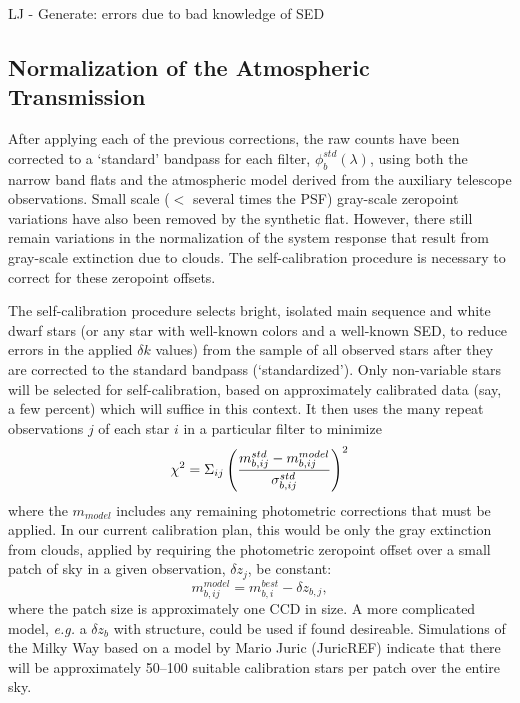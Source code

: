 \documentclass[12pt,preprint]{aastex}
\begin{document}
LJ - Generate: errors due to bad knowledge of SED


\subsection{Normalization of the Atmospheric Transmission}
\label{sec:selfcalib}

After applying each of the previous corrections, the raw counts have been
corrected to a `standard' bandpass for each filter,
$\phi_b^{std}(\lambda)$, using both the narrow band flats and the
atmospheric model derived from the auxiliary telescope
observations. Small scale ($<$ several times the PSF) gray-scale
zeropoint variations have also been removed by the synthetic
flat. However, there still remain variations in the normalization of the
system response that result from gray-scale extinction due to
clouds. The self-calibration procedure is necessary to correct for
these zeropoint offsets.

The self-calibration procedure selects bright, isolated main sequence
and white dwarf stars (or any star with well-known colors and a
well-known SED, to reduce errors in the applied
$\delta k$ values) from the sample of all observed stars after they are
corrected to the standard bandpass (`standardized'). Only non-variable stars will be
selected for self-calibration, based on approximately calibrated data
(say, a few percent) which will suffice in this context. It then uses
the many repeat observations $j$ of each star $i$ in a particular filter to minimize
\begin{equation}
\label{eqn:selfcalmin}
\chi^2 = \Sigma_{ij} \left(  { m_{b,ij}^{std} - m_{b,ij}^{model} \over
    \sigma_{b,ij}^{std} } \right)^2
\end{equation}
where the $m_{model}$ includes any remaining photometric corrections
that must be applied. In our current calibration plan, this would be only the
gray extinction from clouds, applied by requiring the photometric
zeropoint offset over a small patch of sky in a given observation, $\delta z_j$, be constant:
\begin{equation}
\label{eqn:zp}
m^{model}_{b,ij} = m^{best}_{b,i} - \delta z_{b,j},
\end{equation}
where the patch size is approximately one CCD in size. A more
complicated model, {\it e.g.} a $\delta z_{b}$ with structure, could
be used if found desireable. Simulations of the Milky Way based on a
model by Mario Juric (JuricREF) indicate that there will be
approximately 50--100 
suitable calibration stars per patch over the entire sky. 
\end{document}
